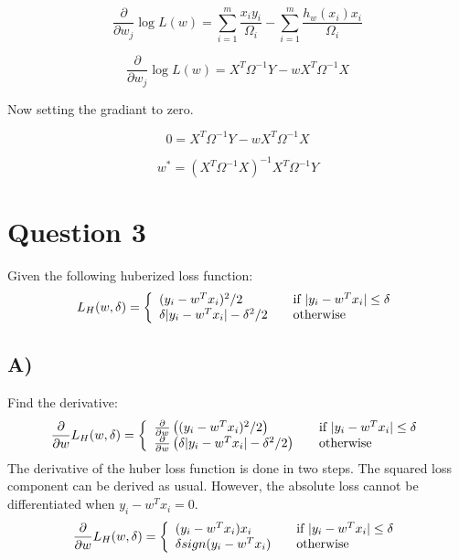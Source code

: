 \documentclass{report}
\begin{document}
\begin{equation}
     \frac{\partial}{\partial w_j} \log L(w) =
     \sum_{i=1}^{m} \frac{x_iy_i}{\Omega_i}
     - \sum_{i=1}^{m}\frac{h_w(x_i)x_i}{\Omega_i}
\end{equation}

\begin{equation}
     \frac{\partial}{\partial w_j} \log L(w) =
     X^T\Omega^{-1}Y - wX^T\Omega^{-1}X
\end{equation}

Now setting the gradiant to zero.

\begin{equation}
     0 =X^T\Omega^{-1}Y
     - wX^T\Omega^{-1}X
\end{equation}

\begin{equation}
     w^* = (X^T\Omega^{-1} X)^{-1} X^T\Omega^{-1} Y
\end{equation}


\section*{Question 3}
Given the following huberized loss function:
\begin{equation}
  L_H(w, \delta) = \left\{
  \begin{array}{l l}
    (y_i - w^Tx_i)^2 / 2 & \quad \text{if }  | y_i - w^Tx_i | \leq \delta\\
    \delta | y_i - w^Tx_i | - \delta^2 / 2 & \quad \text{otherwise}

  \end{array} \right.\end{equation}


\subsection*{A)}
Find the derivative:
\begin{equation}
  \frac{\partial}{\partial w} L_H(w, \delta) = \left\{
  \begin{array}{l l}
    \frac{\partial}{\partial w} \left((y_i - w^Tx_i)^2 / 2 \right)& \quad \text{if }  | y_i - w^Tx_i | \leq \delta\\
    \frac{\partial}{\partial w} \left(\delta | y_i - w^Tx_i | - \delta^2 / 2\right) & \quad \text{otherwise}

  \end{array} \right.\end{equation}
The derivative of the huber loss function is done in two steps. The squared loss component can be derived as usual.
However, the absolute loss cannot be differentiated when $ y_i - w^Tx_i = 0$.
\begin{equation}
  \frac{\partial}{\partial w} L_H(w, \delta) = \left\{
  \begin{array}{l l}
    (y_i - w^Tx_i) x_i & \quad \text{if }  | y_i - w^Tx_i | \leq \delta\\
    \delta sign ( y_i - w^Tx_i ) & \quad \text{otherwise}

  \end{array} \right.\end{equation}
\end{document}
